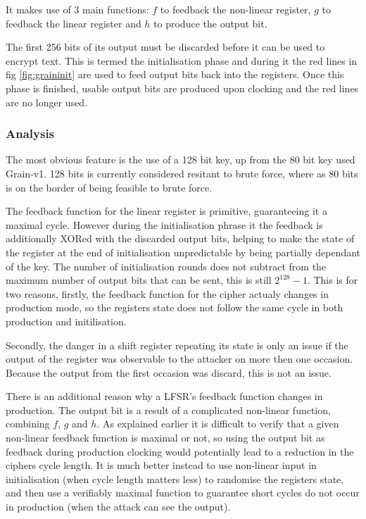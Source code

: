 \documentclass{report}
\let\Oldsubsubsection\subsubsection
\renewcommand{\subsubsection}{\FloatBarrier\Oldsubsubsection}
\begin{document}
It makes use of 3 main functions: $f$ to feedback the non-linear register, $g$ to feedback the linear register and $h$ to produce the output bit.

The first 256 bits of its output must be discarded before it can be used to encrypt text. This is termed the initialisation phase and during it the red lines in fig \ref{fig:graininit} are used to feed output bits back into the registers. Once this phase is finished, usable output bits are produced upon clocking and the red lines are no longer used.
\subsubsection{Analysis}

The most obvious feature is the use of a 128 bit key, up from the 80 bit key used Grain-v1. 128 bits is currently considered resitant to brute force, where as 80 bits is on the border of being feasible to brute force\cite{80keysize}.

The feedback function for the linear register is primitive, guaranteeing it a maximal cycle\cite{?}. However during the initialisation phrase it the feedback is additionally XORed with the discarded output bits, helping to make the state of the register at the end of initialisation unpredictable by being partially dependant of the key. The number of initialisation rounds does not subtract from the maximum number of output bits that can be sent, this is still $2^128-1$. This is for two reasons, firstly, the feedback function for the cipher actualy changes in production mode, so the registers state does not follow the same cycle in both production and initilisation.

Secondly, the danger in a shift register repeating its state is only an issue if the output of the register was observable to the attacker on more then one occasion. Because the output from the first occasion was discard, this is not an issue.

There is an additional reason why a LFSR's feedback function changes in production. The output bit is a result of a complicated non-linear function, combining $f$, $g$ and $h$. As explained earlier it is difficult to verify that a given non-linear feedback function is maximal or not, so using the output bit as feedback during production clocking would potentially lead to a reduction in the ciphers cycle length. It is much better instead to use non-linear input in initialisation (when cycle length matters less) to randomise the registers state, and then use a verifiably maximal function to guarantee short cycles do not occur in production (when the attack can see the output).
\end{document}
